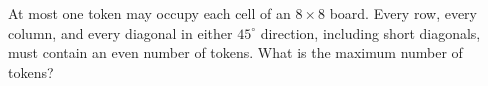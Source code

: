 At most one token may occupy each cell of an $8\times8$ board. Every row, every column, and every diagonal in either $45^\circ$ direction, including short diagonals, must contain an even number of tokens. What is the maximum number of tokens?
